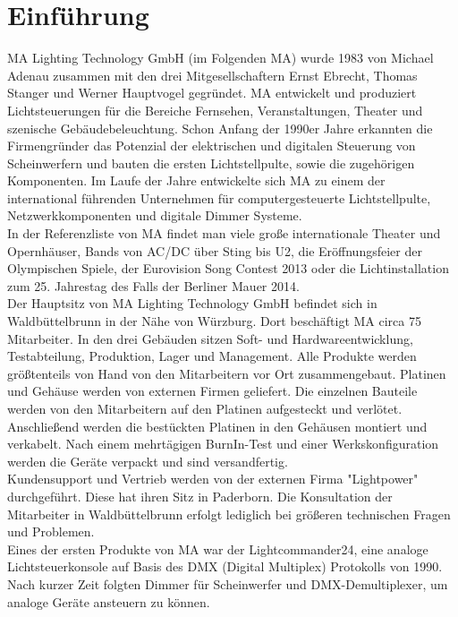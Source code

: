 \documentclass[11pt]{scrartcl}
\begin{document}
\section{Einführung}
MA Lighting Technology GmbH (im Folgenden MA) wurde 1983 von Michael Adenau zusammen mit
den drei Mitgesellschaftern Ernst Ebrecht, Thomas Stanger und Werner Hauptvogel gegründet. MA
entwickelt und produziert Lichtsteuerungen für die Bereiche Fernsehen, Veranstaltungen, Theater
und szenische Gebäudebeleuchtung. Schon Anfang der 1990er Jahre erkannten die Firmengründer
das Potenzial der elektrischen und digitalen Steuerung von Scheinwerfern und bauten die ersten
Lichtstellpulte, sowie die zugehörigen Komponenten. Im Laufe der Jahre entwickelte sich MA zu
einem der international führenden Unternehmen für computergesteuerte Lichtstellpulte,
Netzwerkkomponenten und digitale Dimmer Systeme.\\
In der Referenzliste von MA findet man viele große internationale Theater und Opernhäuser, Bands
von AC/DC über Sting bis U2, die Eröffnungsfeier der Olympischen Spiele, der Eurovision Song
Contest 2013 oder die Lichtinstallation zum 25. Jahrestag des Falls der Berliner Mauer 2014.\\
Der Hauptsitz von MA Lighting Technology GmbH
befindet sich in Waldbüttelbrunn in der Nähe von
Würzburg. Dort beschäftigt MA circa 75 Mitarbeiter. In
den drei Gebäuden sitzen Soft- und Hardwareentwicklung,
Testabteilung, Produktion, Lager und
Management. Alle Produkte werden größtenteils von
Hand von den Mitarbeitern vor Ort zusammengebaut.
Platinen und Gehäuse werden von externen Firmen
geliefert. Die einzelnen Bauteile werden von den
Mitarbeitern auf den Platinen aufgesteckt und verlötet.
Anschließend werden die bestückten Platinen in den Gehäusen montiert und verkabelt. Nach einem
mehrtägigen BurnIn-Test und einer Werkskonfiguration werden die Geräte verpackt und sind
versandfertig.\\
Kundensupport und Vertrieb werden von der externen Firma "Lightpower" durchgeführt. Diese hat
ihren Sitz in Paderborn. Die Konsultation der Mitarbeiter in Waldbüttelbrunn erfolgt lediglich bei
größeren technischen Fragen und Problemen.\\
Eines der ersten Produkte von MA war der Lightcommander24, eine analoge Lichtsteuerkonsole auf
Basis des DMX (Digital Multiplex) Protokolls von 1990. Nach kurzer Zeit folgten Dimmer für
Scheinwerfer und DMX-Demultiplexer, um analoge Geräte ansteuern zu können.\\
\\
\end{document}
